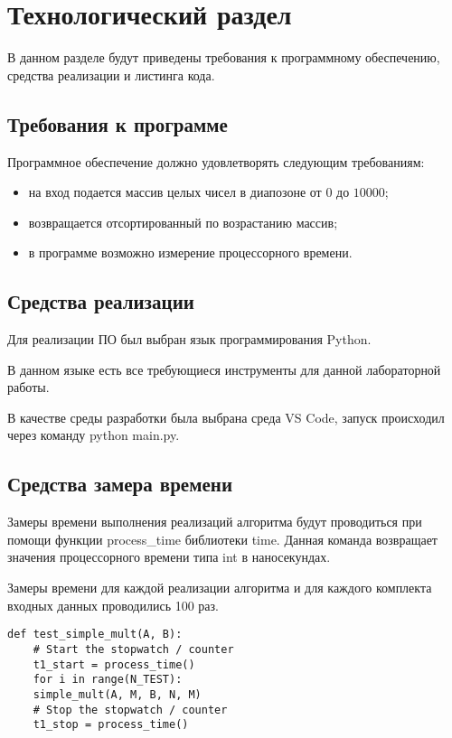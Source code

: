\chapter{Технологический раздел}

В данном разделе будут приведены требования к программному обеспечению, средства реализации и листинга кода.

\section{Требования к программе}

Программное обеспечение должно удовлетворять следующим требованиям:
\begin{itemize}
	\item на вход подается массив целых чисел в диапозоне от $0$ до $10000$;
	\item возвращается отсортированный по возрастанию массив;
	\item в программе возможно измерение процессорного времени.
\end{itemize}

\section{Средства реализации} 
Для реализации ПО был выбран язык программирования Python\cite{python}. 

В данном языке есть все требующиеся инструменты для данной лабораторной работы.

В качестве среды разработки была выбрана среда VS Code\cite{vscode}, запуск происходил через команду python main.py.

\section{Средства замера времени}

Замеры времени выполнения реализаций алгоритма будут проводиться при помощи функции process\_time \cite{test} библиотеки time. Данная команда возвращает значения процессорного времени типа int в наносекундах.

Замеры времени для каждой реализации алгоритма и для каждого комплекта входных данных проводились 100 раз.
\newpage
\begin{lstlisting}[label=bench,caption=Пример замера затраченного времени]
	def test_simple_mult(A, B):
	# Start the stopwatch / counter 
	t1_start = process_time() 
	for i in range(N_TEST):
	simple_mult(A, M, B, N, M)
	# Stop the stopwatch / counter
	t1_stop = process_time()
\end{lstlisting}



